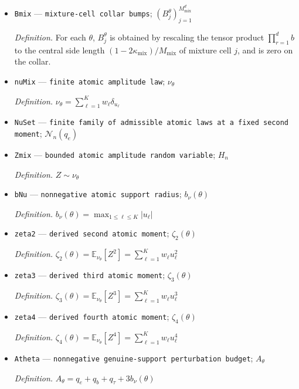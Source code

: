 \documentclass{article}
\begin{document}
\begin{itemize}
  \par\smallskip\noindent\emph{Definition.} \(\theta=(M_{\mathrm{mix}},\kappa_{\mathrm{mix}},q_e,q_b,q_\tau,K,(w_\ell,u_\ell)_{\ell=1}^K)\)
  \item \texttt{Bmix} --- \texttt{mixture-\allowbreak{}cell collar bumps}; \((B_j^\theta)_{j=1}^{M_{\mathrm{mix}}^d}\)
  \par\smallskip\noindent\emph{Definition.} For each \(\theta\), \(B_j^\theta\) is obtained by rescaling the tensor product \(\prod_{r=1}^d b\) to the central side length \((1-2\kappa_{\mathrm{mix}})/M_{\mathrm{mix}}\) of mixture cell \(j\), and is zero on the collar.
  \item \texttt{nuMix} --- \texttt{finite atomic amplitude law}; \(\nu_\theta\)
  \par\smallskip\noindent\emph{Definition.} \(\nu_\theta=\sum_{\ell=1}^K w_\ell\delta_{u_\ell}\)
  \item \texttt{NuSet} --- \texttt{finite family of admissible atomic laws at a fixed second moment}; \(\mathcal N_n(q_e)\)
  \item \texttt{Zmix} --- \texttt{bounded atomic amplitude random variable}; \(H_n\)
  \par\smallskip\noindent\emph{Definition.} \(Z\sim\nu_\theta\)
  \item \texttt{bNu} --- \texttt{nonnegative atomic support radius}; \(b_\nu(\theta)\)
  \par\smallskip\noindent\emph{Definition.} \(b_\nu(\theta)=\max_{1\le\ell\le K}|u_\ell|\)
  \item \texttt{zeta2} --- \texttt{derived second atomic moment}; \(\zeta_2(\theta)\)
  \par\smallskip\noindent\emph{Definition.} \(\zeta_2(\theta)=\mathbb E_{\nu_\theta}[Z^2]=\sum_{\ell=1}^K w_\ell u_\ell^2\)
  \item \texttt{zeta3} --- \texttt{derived third atomic moment}; \(\zeta_3(\theta)\)
  \par\smallskip\noindent\emph{Definition.} \(\zeta_3(\theta)=\mathbb E_{\nu_\theta}[Z^3]=\sum_{\ell=1}^K w_\ell u_\ell^3\)
  \item \texttt{zeta4} --- \texttt{derived fourth atomic moment}; \(\zeta_4(\theta)\)
  \par\smallskip\noindent\emph{Definition.} \(\zeta_4(\theta)=\mathbb E_{\nu_\theta}[Z^4]=\sum_{\ell=1}^K w_\ell u_\ell^4\)
  \item \texttt{Atheta} --- \texttt{nonnegative genuine-\allowbreak{}support perturbation budget}; \(A_\theta\)
  \par\smallskip\noindent\emph{Definition.} \(A_\theta=q_e+q_b+q_\tau+3b_\nu(\theta)\)

\end{itemize}
\end{document}
